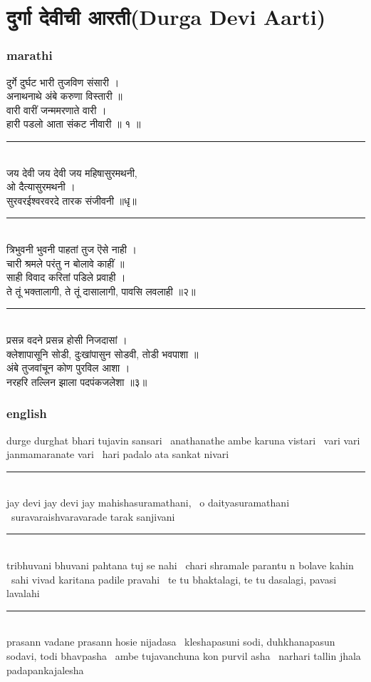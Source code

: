 \documentclass[letterpaper,twocolumn,openany,nodeprecatedcode]{dndbook}
\begin{document}
\chapter{दुर्गा देवीची आरती(Durga Devi Aarti)}
\begin{flushleft}
  \subsection*{marathi}
  दुर्गे दुर्घट भारी तुजविण संसारी । \\
  अनाथनाथे अंबे करुणा विस्तारी ॥\\
  वारी वारीं जन्ममरणाते वारी । \\
  हारी पडलो आता संकट नीवारी ॥ १ ॥ \\
  \rule{\linewidth}{1pt} \\
  जय देवी जय देवी जय महिषासुरमथनी, \\ ओ दैत्यासुरमथनी । \\
  सुरवरईश्वरवरदे तारक संजीवनी ॥धृ॥ \\
  \rule{\linewidth}{1pt} \\
  त्रिभुवनी भुवनी पाहतां तुज ऎसे नाही । \\
  चारी श्रमले परंतु न बोलावे काहीं ॥ \\
  साही विवाद करितां पडिले प्रवाही । \\
  ते तूं भक्तालागी, ते तूं दासालागी, पावसि लवलाही ॥२॥ \\
  \rule{\linewidth}{1pt} \\
  प्रसन्न वदने प्रसन्न होसी निजदासां । \\
  क्लेशापासूनि सोडी, दुःखांपासुन सोडवी, तोडी भवपाशा ॥ \\
  अंबे तुजवांचून कोण पुरविल आशा । \\
  नरहरि तल्लिन झाला पदपंकजलेशा ॥३॥ \\
  \pagebreak
  \subsection*{english}
  durge durghat bhari tujavin sansari \ anathanathe ambe karuna vistari \ vari vari janmamaranate vari \ hari padalo ata sankat nivari \\
  \rule{\linewidth}{1pt} \\
  jay devi jay devi jay mahishasuramathani, \ o daityasuramathani \ suravaraishvaravarade tarak sanjivani \\
  \rule{\linewidth}{1pt} \\
  tribhuvani bhuvani pahtana tuj se nahi \ chari shramale parantu n bolave kahin \ sahi vivad karitana padile pravahi \ te tu bhaktalagi, te tu dasalagi, pavasi lavalahi \\
  \rule{\linewidth}{1pt} \\
  prasann vadane prasann hosie nijadasa \ kleshapasuni sodi, duhkhanapasun sodavi, todi bhavpasha \ ambe tujavanchuna kon purvil asha \ narhari tallin jhala padapankajalesha \\

\end{flushleft}
\pagebreak
\end{document}
